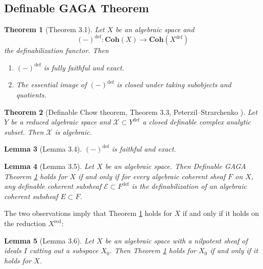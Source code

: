 \documentclass{amsart}
\newtheorem{theorem}{Theorem}[subsection]
\newtheorem{lemma}[theorem]{Lemma}
\theoremstyle{definition}
\numberwithin{equation}{section}
\newcommand{\definable}{\mathrm{def}}
\begin{document}
\subsection{Definable GAGA Theorem}
\hfill
\begin{tcolorbox}[title = {\Large Goal}]
  \begin{theorem}[Theorem 3.1]
    \label{def GAGA}
    Let $X$ be an algebraic space and
    \[(-)^{\definable} : \mathbf{Coh}(X) \to \mathbf{Coh}(X^{\definable})\]
    the definabilization functor.
    Then
    \begin{enumerate}[label = {(\arabic*)}]
      \item $(-)^{\definable}$ is fully faithful and exact.
      \item The essential image of $(-)^{\definable}$ is closed under taking subobjects and quotients.
    \end{enumerate}
  \end{theorem}
\end{tcolorbox}

\begin{theorem}[{Definable Chow theorem, Theorem 3.3, Peterzil--Strarchenko \cite[Corollary 4.5]{zbMATH05364146}}]
  Let $Y$ be a reduced algebraic space and
  $\mathcal{X} \subset Y^{\definable}$ a closed definable complex analytic subset.
  Then $\mathcal{X}$ is algebraic.
\end{theorem}

\begin{lemma}[Lemma 3.4]
  $(-)^{\definable}$ is faithful and exact.
\end{lemma}

\begin{lemma}[Lemma 3.5]
  \label{Lemma 3.5}
  Let $X$ be an algebraic space.
  Then Definable GAGA Theorem \ref{def GAGA} holds for $X$ if and only if
  for every algebraic coherent sheaf $F$ on $X$,
  any definable coherent subsheaf $\mathcal{E} \subset F^{\definable}$ is the definabilization of
  an algebraic coherent subsheaf $E \subset F$.
\end{lemma}

The two observations imply that Theorem \ref{def GAGA} holds for $X$
if and only if it holds on the reduction $X^{\mathrm{red}}$:
\begin{lemma}[Lemma 3.6]
  \label{Lemma 3.6}
  Let $X$ be an algebraic space with a nilpotent sheaf of ideals $I$ cutting out a subspace $X_0$.
  Then Theorem \ref{def GAGA} holds for $X_0$ if and only if it holds for $X$.
\end{lemma}
\end{document}
